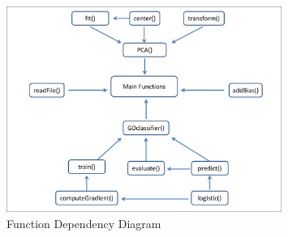 \begin{figure}[H]
\centering
\includegraphics[width=0.8\textwidth]{./figures/diagram.pdf}
\caption{\label{fig:diagram} Function Dependency Diagram}
\end{figure}

